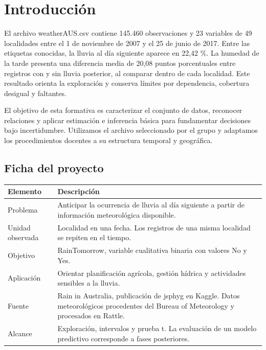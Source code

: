 \documentclass[11pt,a4paper]{article}
\begin{document}
\tableofcontents
\clearpage


\section{Introducción}

El archivo weatherAUS.csv contiene 145.460 observaciones y 23 variables de 49 localidades entre el 1 de noviembre de 2007 y el 25 de junio de 2017. Entre las etiquetas conocidas, la lluvia al día siguiente aparece en 22,42 \%. La humedad de la tarde presenta una diferencia media de 20,08 puntos porcentuales entre registros con y sin lluvia posterior, al comparar dentro de cada localidad. Este resultado orienta la exploración y conserva límites por dependencia, cobertura desigual y faltantes.


El objetivo de esta formativa es caracterizar el conjunto de datos, reconocer relaciones y aplicar estimación e inferencia básica para fundamentar decisiones bajo incertidumbre. Utilizamos el archivo seleccionado por el grupo y adaptamos los procedimientos docentes a su estructura temporal y geográfica.


\subsection{Ficha del proyecto}

\begin{table}[H]
\centering
\small
\renewcommand{\arraystretch}{1.18}
\setlength{\tabcolsep}{5pt}
\begin{tabularx}{\linewidth}{@{}L{2.7cm}Y@{}}
\toprule

\textbf{Elemento} & \textbf{Descripción} \\
\midrule

Problema & Anticipar la ocurrencia de lluvia al día siguiente a partir de información meteorológica disponible. \\

Unidad observada & Localidad en una fecha. Los registros de una misma localidad se repiten en el tiempo. \\

Objetivo & RainTomorrow, variable cualitativa binaria con valores No y Yes. \\

Aplicación & Orientar planificación agrícola, gestión hídrica y actividades sensibles a la lluvia. \\

Fuente & Rain in Australia, publicación de jsphyg en Kaggle. Datos meteorológicos procedentes del Bureau of Meteorology y procesados en Rattle. \\

Alcance & Exploración, intervalos y prueba t. La evaluación de un modelo predictivo corresponde a fases posteriores. \\

\bottomrule
\end{tabularx}

\end{table}
\end{document}
